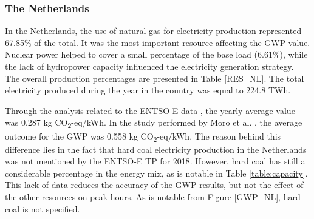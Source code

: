 {{\subsubsection{The Netherlands}

In the Netherlands, the use of natural gas for electricity production represented  67.85\% of the total. It was the most important resource affecting the GWP value. Nuclear power helped to cover a small percentage of the base load {(6.61\%)}, while the lack of hydropower capacity influenced the electricity generation strategy.  The overall production percentages are presented in Table \ref{RES_NL}.  The total electricity produced during the year in the country was equal to 224.8 TWh.

 \begin{table}[htbp]
\centering
\caption{Percentage of resources used during peak and off-peak hours in the Netherlands \cite{Entso-eProduction}.}
\label{RES_NL}
\end{table}

 Through the analysis related to the ENTSO-E data \cite{Entso-eProduction}, the yearly average value was 0.287 kg CO\textsubscript2-eq/kWh. In the study performed by Moro et al. \cite{Moro2017}, the average outcome for the GWP was 0.558 kg CO\textsubscript2-eq/kWh. The reason behind this difference lies in the fact that hard coal electricity production in the Netherlands was not mentioned by the ENTSO-E TP for 2018. However, hard coal has still a considerable percentage in the energy mix, as is notable in Table \ref{table:capacity}. This lack of data reduces the accuracy of the GWP results, but not the effect of the other resources on peak hours. As is notable from Figure \ref{GWP_NL}, hard coal is not specified.  
 
}}
